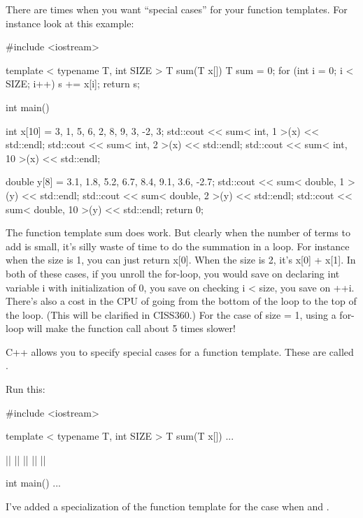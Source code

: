 \newpage{}

There are times when you want ``special cases'' for your function
templates. For instance look at this example:

\begin{consolethree}[escapeinside=||]
#include <iostream>

template < typename T, int SIZE >
T sum(T x[])
{
    T sum = 0;
    for (int i = 0; i < SIZE; i++)
    {
        s += x[i];
    }
    return s;
}

int main()
{
    int x[10] = {3, 1, 5, 6, 2, 8, 9, 3, -2, 3};
    std::cout << sum< int, 1 >(x) << std::endl;
    std::cout << sum< int, 2 >(x) << std::endl;
    std::cout << sum< int, 10 >(x) << std::endl;

    double y[8] = {3.1, 1.8, 5.2, 6.7,
                   8.4, 9.1, 3.6, -2.7};
    std::cout << sum< double, 1 >(y) << std::endl;
    std::cout << sum< double, 2 >(y) << std::endl;
    std::cout << sum< double, 10 >(y) << std::endl;
    return 0;
}
\end{consolethree}

The function template sum does work. But clearly when the number of
terms to add is small, it's silly waste of time to do the summation in a
loop. For instance when the size is 1, you can just return x[0].
When the size is 2, it's x[0] + x[1]. In both of these cases, if
you unroll the for-loop, you would save on declaring int variable i with
initialization of 0, you save on checking i < size, you save
on ++i. There's also a cost in the CPU of going from the bottom of the
loop to the top of the loop. (This will be clarified in CISS360.) For
the case of size = 1, using a for-loop will make the function call about
5 times slower!

C++ allows you to specify special cases for a function template. These are called .

Run this:

\begin{consolethree}[escapeinside=||]
#include <iostream>

template < typename T, int SIZE >
T sum(T x[])
{
    ...
}

||
||
|\EMPHASIZE{\{}|
    ||
|\EMPHASIZE{\}}|

int main()
{
    ...
}
\end{consolethree}

I've added a specialization of the  function template for the case when  and .

